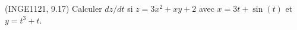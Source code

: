 
\begin{exercice}\label{exoFoncDeuxVar0030}

	(INGE1121, 9.17) Calculer $dz/dt$ si $z=3x^2+xy+2$ avec $x=3t+\sin(t)$ et $y=t^3+t$.

\end{exercice}
